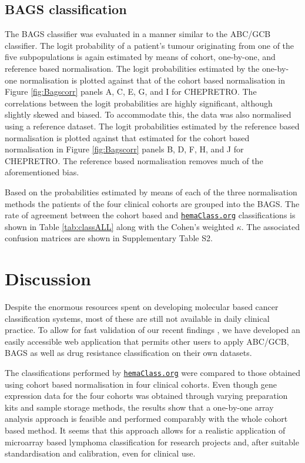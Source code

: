 \documentclass[twocolumn]{bmcart}%
\newcommand{\hemaClass}{\href{http://hemaClass.org}{\texttt{hemaClass.org}}}
\begin{document}
\subsection{BAGS classification}
The BAGS classifier was evaluated in a manner similar to the ABC/GCB classifier.
The logit probability of a patient's tumour originating from one of the five subpopulations is again estimated by means of cohort, one-by-one, and reference based normalisation.
The logit probabilities estimated by the one-by-one normalisation is plotted against that of the cohort based normalisation in Figure \ref{fig:Bagscorr} panels A, C, E, G, and I for CHEPRETRO.
The correlations between the logit probabilities are highly significant, although slightly skewed and biased.
To accommodate this, the data was also normalised using a reference dataset.
The logit probabilities estimated by the reference based normalisation is plotted against that estimated for the cohort based normalisation in Figure \ref{fig:Bagscorr} panels B, D, F, H, and J for CHEPRETRO.
The reference based normalisation removes much of the aforementioned bias.

Based on the probabilities estimated by means of each of the three normalisation methods the patients of the four clinical cohorts are grouped into the BAGS.
The rate of agreement between the cohort based and \hemaClass{} classifications is shown in Table \ref{tab:classALL} along with the Cohen's weighted $\kappa$.
The associated confusion matrices are shown in Supplementary Table S2.%




\section{Discussion}
Despite the enormous resources spent on developing molecular based cancer classification systems,
most of these are still not available in daily clinical practice.
To allow for fast validation of our recent findings \cite{DybkaerBoegsted2015, Falgreen2015}, we have developed an easily accessible web application that permits other users to apply ABC/GCB, BAGS as well as drug resistance classification on their own datasets.

The classifications performed by \hemaClass{} were compared to those obtained using cohort based normalisation in four clinical cohorts.
Even though gene expression data for the four cohorts was obtained through varying preparation kits and sample storage methods, the results show that a one-by-one array analysis approach is feasible and performed comparably with the whole cohort based method.
It seems that this approach allows for a realistic application of microarray based lymphoma classification for research projects and, after suitable standardisation and calibration, even for clinical use.
\end{document}
